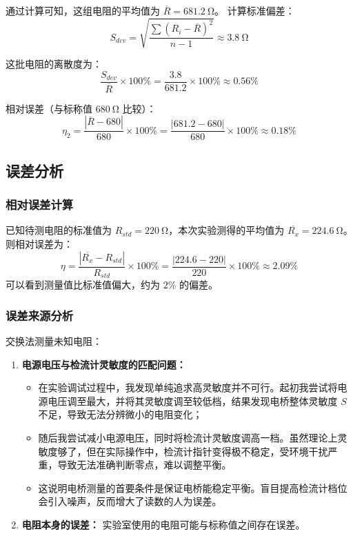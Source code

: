 \documentclass{../template/Report}%
\begin{document}
\begin{fullreportonly}
    通过计算可知，这组电阻的平均值为 $\overline{R} = \SI{681.2}{\ohm}$。
    计算标准偏差：
    \[S_{dev} = \sqrt{\frac{\sum(R_{i} - \overline{R})^2}{n-1}} \approx \SI{3.8}{\ohm}\]

    这批电阻的离散度为：
    \[\frac{S_{dev}}{\overline{R}} \times 100\% = \frac{3.8}{681.2} \times 100\% \approx 0.56\% \]

    相对误差（与标称值 $\SI{680}{\ohm}$ 比较）：
    \[ \eta_2 = \frac{|\overline{R} - 680|}{680} \times 100\% = \frac{|681.2 - 680|}{680} \times 100\% \approx 0.18\% \]

    \subsection{误差分析}
    \subsubsection{相对误差计算}
    已知待测电阻的标准值为 $R_{std} = \SI{220}{\ohm}$，本次实验测得的平均值为 $\overline{R_x} = \SI{224.6}{\ohm}$。
    则相对误差为：
    \[ \eta = \frac{|\overline{R_x} - R_{std}|}{R_{std}} \times 100\% = \frac{|224.6 - 220|}{220} \times 100\% \approx 2.09\% \]
    可以看到测量值比标准值偏大，约为 $2\%$ 的偏差。

    \subsubsection{误差来源分析}
    交换法测量未知电阻：
    \begin{enumerate}
        \item \textbf{电源电压与检流计灵敏度的匹配问题：}
              \begin{itemize}
                  \item 在实验调试过程中，我发现单纯追求高灵敏度并不可行。起初我尝试将电源电压调至最大，并将其灵敏度调至较低档，结果发现电桥整体灵敏度 $S$ 不足，导致无法分辨微小的电阻变化；
                  \item 随后我尝试减小电源电压，同时将检流计灵敏度调高一档。虽然理论上灵敏度够了，但在实际操作中，检流计指针变得极不稳定，受环境干扰严重，导致无法准确判断零点，难以调整平衡。
                  \item 这说明电桥测量的首要条件是保证电桥能稳定平衡。盲目提高检流计档位会引入噪声，反而增大了读数的人为误差。
              \end{itemize}

        \item \textbf{电阻本身的误差：}
              实验室使用的电阻可能与标称值之间存在误差。


\end{enumerate}
\end{fullreportonly}
\end{document}
